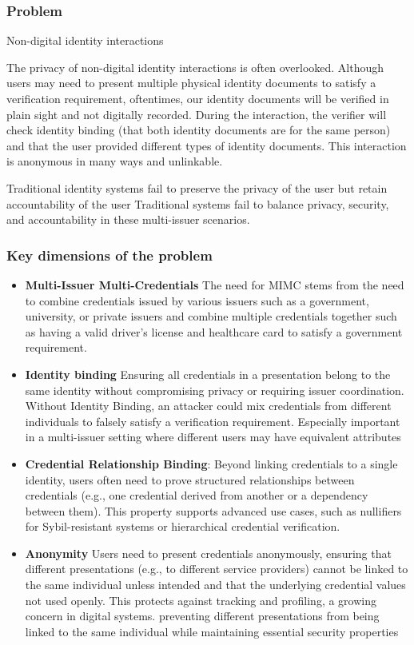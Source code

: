 \subsubsection{Problem}

Non-digital identity interactions 

The privacy of non-digital identity interactions is often overlooked. Although users may need to present multiple physical identity documents to satisfy a verification requirement, oftentimes, our identity documents will be verified in plain sight and not digitally recorded. During the interaction, the verifier will check identity binding (that both identity documents are for the same person) and that the user provided different types of identity documents. This interaction is anonymous in many ways and unlinkable. 

Traditional identity systems fail to preserve the privacy of the user but retain accountability of the user 
Traditional systems fail to balance privacy, security, and accountability in these multi-issuer scenarios.

\subsubsection{Key dimensions of the problem}
\begin{itemize}
    \item \textbf{Multi-Issuer Multi-Credentials} The need for MIMC stems from the need to combine credentials issued by various issuers such as a government, university, or private issuers and combine multiple credentials together such as having a valid driver's license and healthcare card to satisfy a government requirement. 

    \item \textbf{Identity binding} Ensuring all credentials in a presentation belong to the same identity without compromising privacy or requiring issuer coordination. Without Identity Binding, an attacker could mix credentials from different individuals to falsely satisfy a verification requirement. Especially important in a multi-issuer setting where different users may have equivalent attributes 

    \item \textbf{Credential Relationship Binding}: Beyond linking credentials to a single identity, users often need to prove structured relationships between credentials (e.g., one credential derived from another or a dependency between them). This property supports advanced use cases, such as nullifiers for Sybil-resistant systems or hierarchical credential verification.

    \item \textbf{Anonymity} Users need to present credentials anonymously, ensuring that different presentations (e.g., to different service providers) cannot be linked to the same individual unless intended and that the underlying credential values not used openly. This protects against tracking and profiling, a growing concern in digital systems. preventing different presentations from being linked to the same individual while maintaining essential security properties


\end{itemize}

